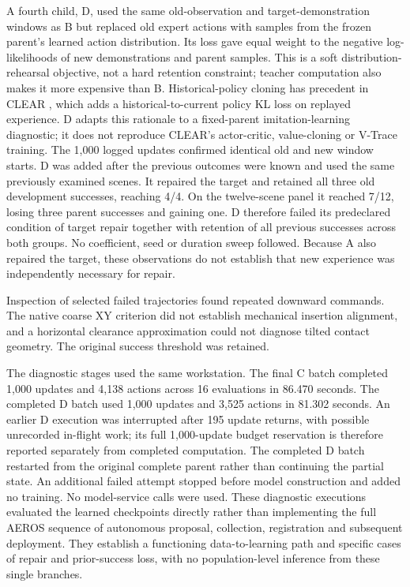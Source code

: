 \documentclass[10pt,letterpaper]{article}
\begin{document}
A fourth child, D, used the same old-observation and
target-demonstration windows as B but replaced old expert actions with
samples from the frozen parent's learned action distribution. Its loss
gave equal weight to the negative log-likelihoods of new demonstrations
and parent samples. This is a soft distribution-rehearsal objective, not
a hard retention constraint; teacher computation also makes it more
expensive than B. Historical-policy cloning has precedent in CLEAR
\cite{NEURIPS2019_fa7cdfad}, which adds a historical-to-current policy
KL loss on replayed experience. D adapts this rationale to a
fixed-parent imitation-learning diagnostic; it does not reproduce
CLEAR's actor-critic, value-cloning or V-Trace training. The 1,000
logged updates confirmed identical old and new window starts. D was
added after the previous outcomes were known and used the same
previously examined scenes. It repaired the target and retained all
three old development successes, reaching 4/4. On the twelve-scene panel
it reached 7/12, losing three parent successes and gaining one. D
therefore failed its predeclared condition of target repair together
with retention of all previous successes across both groups. No
coefficient, seed or duration sweep followed. Because A also repaired
the target, these observations do not establish that new experience was
independently necessary for repair.

Inspection of selected failed trajectories found repeated downward
commands. The native coarse XY criterion did not establish mechanical
insertion alignment, and a horizontal clearance approximation could not
diagnose tilted contact geometry. The original success threshold was
retained.

The diagnostic stages used the same workstation. The final C batch
completed 1,000 updates and 4,138 actions across 16 evaluations in
86.470 seconds. The completed D batch used 1,000 updates and 3,525
actions in 81.302 seconds. An earlier D execution was interrupted after
195 update returns, with possible unrecorded in-flight work; its full
1,000-update budget reservation is therefore reported separately from
completed computation. The completed D batch restarted from the original
complete parent rather than continuing the partial state. An additional
failed attempt stopped before model construction and added no training.
No model-service calls were used. These diagnostic executions evaluated
the learned checkpoints directly rather than implementing the full AEROS
sequence of autonomous proposal, collection, registration and subsequent
deployment. They establish a functioning data-to-learning path and
specific cases of repair and prior-success loss, with no
population-level inference from these single branches.
\end{document}
